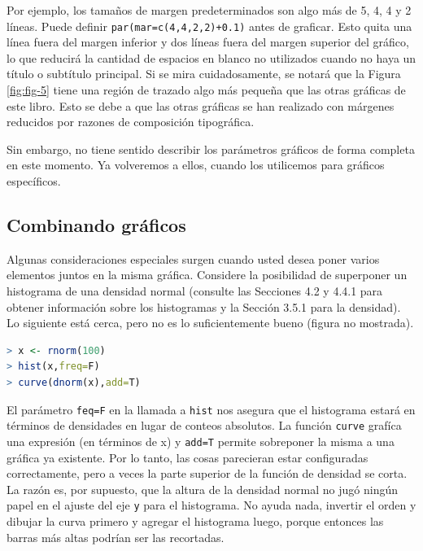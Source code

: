 Por ejemplo, los tamaños de margen predeterminados son algo más de 5, 4, 4 y 2
líneas.  Puede definir \texttt{par(mar=c(4,4,2,2)+0.1)} antes de graficar. Esto
quita una línea fuera del margen inferior y dos líneas fuera del margen superior
del gráfico, lo que reducirá la cantidad de espacios en blanco no utilizados
cuando no haya un título o subtítulo principal. Si se mira cuidadosamente, se
notará que la Figura \ref{fig:fig-5} tiene una región de trazado algo más
pequeña que las otras gráficas de este libro. Esto se debe a que las otras
gráficas se han realizado con márgenes reducidos por razones de composición
tipográfica.

Sin embargo, no tiene sentido describir los parámetros gráficos de forma
completa en este momento. Ya volveremos a ellos, cuando los utilicemos 
para gráficos específicos.

\subsection{Combinando gráficos}

Algunas consideraciones especiales surgen cuando usted desea poner varios
elementos juntos en la misma gráfica. Considere la posibilidad de superponer un
histograma de una densidad normal (consulte las Secciones 4.2 y 4.4.1 para
obtener información sobre los histogramas y la Sección 3.5.1 para la densidad).
Lo siguiente está cerca, pero no es lo suficientemente bueno (figura no
mostrada).

\begin{lstlisting}[language=R]
> x <- rnorm(100)
> hist(x,freq=F)
> curve(dnorm(x),add=T)
\end{lstlisting}

El parámetro \texttt{feq=F} en la llamada a \texttt{hist} nos asegura que el
histograma estará en términos de densidades en lugar de conteos absolutos.  La
función \texttt{curve} grafíca una expresión (en términos de x) y \texttt{add=T}
permite sobreponer la misma a una gráfica ya existente.  Por lo tanto, las cosas
parecieran estar configuradas correctamente, pero a veces la parte superior de
la función de densidad se corta. La razón es, por supuesto, que la altura de la
densidad normal no jugó ningún papel en el ajuste del eje \texttt{y} para el
histograma. No ayuda nada,  invertir el orden y dibujar la curva primero y
agregar el histograma luego, porque entonces las barras más altas podrían ser
las recortadas.


